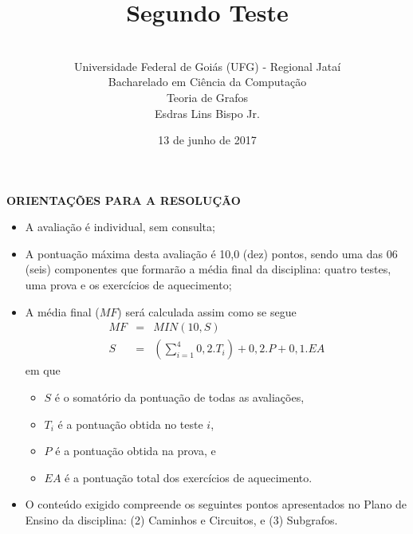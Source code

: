 \documentclass[12pt,a4paper,oneside]{article}
\author{\\Universidade Federal de Goiás (UFG) - Regional Jataí\\Bacharelado em Ciência da Computação \\Teoria de Grafos \\Esdras Lins Bispo Jr.}
\title{\sc \huge Segundo Teste}
\date{13 de junho de 2017}
\begin{document}
\maketitle

{\bf ORIENTAÇÕES PARA A RESOLUÇÃO}

\footnotesize

\begin{itemize}
	\item A avaliação é individual, sem consulta;
	\item A pontuação máxima desta avaliação é 10,0 (dez) pontos, sendo uma das 06 (seis) componentes que formarão a média final da disciplina: quatro testes, uma prova e os exercícios de aquecimento;
	\item A média final ($MF$) será calculada assim como se segue
	\begin{eqnarray}
		MF & = & MIN(10, S) \nonumber \\
		S & = & (\sum_{i=1}^{4} 0,2.T_i ) + 0,2.P  + 0,1.EA \nonumber
	\end{eqnarray}
	em que 
	\begin{itemize}
		\item $S$ é o somatório da pontuação de todas as avaliações,
		\item $T_i$ é a pontuação obtida no teste $i$,
		\item $P$ é a pontuação obtida na prova, e
		\item $EA$ é a pontuação total dos exercícios de aquecimento.
	\end{itemize}
	\item O conteúdo exigido compreende os seguintes pontos apresentados no Plano de Ensino da disciplina: (2) Caminhos e Circuitos, e (3) Subgrafos.
\end{itemize}


\begin{center}
\end{center}

\newpage

\normalsize
\end{document}
